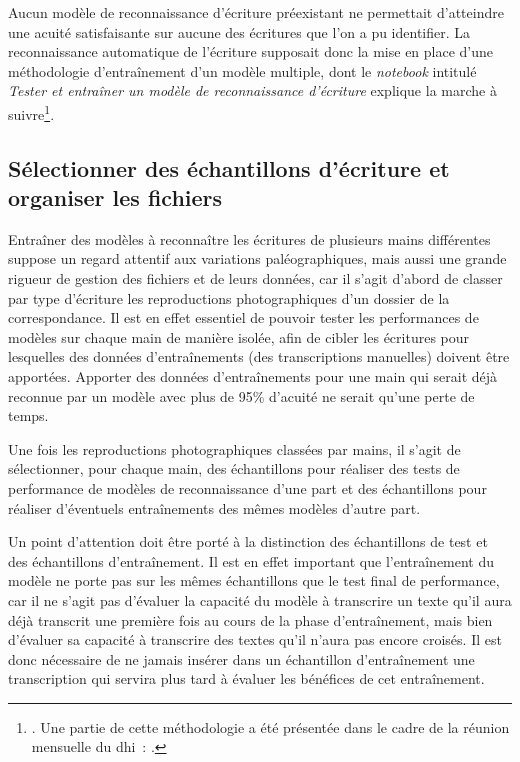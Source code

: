 \documentclass[a4paper,12pt,twoside]{book}
\begin{document}
			Aucun modèle de reconnaissance d'écriture préexistant ne permettait d'atteindre une acuité satisfaisante sur aucune des écritures que l'on a pu identifier. La reconnaissance automatique de l'écriture supposait donc la mise en place d'une méthodologie d'entraînement d'un modèle multiple, dont le \textit{notebook} intitulé \textit{Tester et entraîner un modèle de reconnaissance d'écriture} explique la marche à suivre\footnote{\cite{biayTesterEntrainerModele2022}. Une partie de cette méthodologie a été présentée dans le cadre de la réunion mensuelle du \gls{dhi}~: \cite{biayIntelligenceArtificelleIHA2022}.}.
			
			\subsection{Sélectionner des échantillons d'écriture et organiser les fichiers}
				Entraîner des modèles à reconnaître les écritures de plusieurs mains différentes suppose un regard attentif aux variations paléographiques, mais aussi une grande rigueur de gestion des fichiers et de leurs données, car il s'agit d'abord de classer par type d'écriture les reproductions photographiques d'un dossier de la correspondance. Il est en effet essentiel de pouvoir tester les performances de modèles sur chaque main de manière isolée, afin de cibler les écritures pour lesquelles des données d'entraînements (des transcriptions manuelles) doivent être apportées. Apporter des données d'entraînements pour une main qui serait déjà reconnue par un modèle avec plus de 95\% d'acuité ne serait qu'une perte de temps.
				
				Une fois les reproductions photographiques classées par mains, il s'agit de sélectionner, pour chaque main, des échantillons pour réaliser des tests de performance de modèles de reconnaissance d'une part et des échantillons pour réaliser d'éventuels entraînements des mêmes modèles d'autre part.
				
				Un point d'attention doit être porté à la distinction des échantillons de test et des échantillons d'entraînement. Il est en effet important que l'entraînement du modèle ne porte pas sur les mêmes échantillons que le test final de performance, car il ne s'agit pas d'évaluer la capacité du modèle à transcrire un texte qu'il aura déjà transcrit une première fois au cours de la phase d'entraînement, mais bien d'évaluer sa capacité à transcrire des textes qu'il n'aura pas encore croisés. Il est donc nécessaire de ne jamais insérer dans un échantillon d'entraînement une transcription qui servira plus tard à évaluer les bénéfices de cet entraînement.
				
\end{document}
